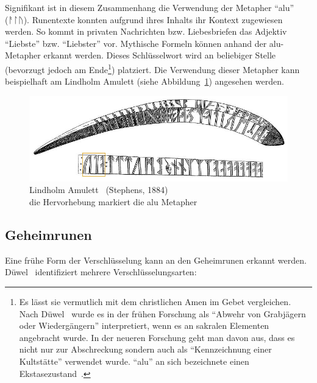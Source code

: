 \documentclass[a4paper]{scrartcl}
\begin{document}
Signifikant ist in diesem Zusammenhang die Verwendung der Metapher \enquote{alu} ({\runicfont ᚨᛚᚢ}). Runentexte konnten aufgrund ihres Inhalts ihr Kontext zugewiesen werden. So kommt in privaten Nachrichten bzw. Liebesbriefen das Adjektiv \enquote{Liebste} bzw. \enquote{Liebster} vor. Mythische Formeln können anhand der alu-Metapher erkannt werden. Dieses Schlüsselwort wird an beliebiger Stelle (bevorzugt jedoch am Ende\footnote{Es lässt sie vermutlich mit dem christlichen Amen im Gebet vergleichen. Nach Düwel~\cite[S. 36]{düwel} wurde es in der frühen Forschung als \enquote{Abwehr von Grabjägern oder Wiedergängern} interpretiert, wenn es an sakralen Elementen angebracht wurde. In der neueren Forschung geht man davon aus, dass es nicht nur zur Abschreckung sondern auch als \enquote{Kennzeichnung einer Kultstätte} verwendet wurde. \enquote{alu} an sich bezeichnete einen Ekstasezustand~\cite[S. 36]{düwel}.}) platziert. Die Verwendung dieser Metapher kann beispielhaft am Lindholm Amulett (siehe Abbildung~\ref{fig:lindholm}) angesehen werden.
%
\begin{figure}[p]
  \begin{center}
    \includegraphics[width=\textwidth]{images/lindholm_amulet.jpg}
    \caption{Lindholm Amulett~\cite{lindholm} (Stephens, 1884) \\ die Hervorhebung markiert die {\glqq alu\grqq} Metapher}
    \label{fig:lindholm}
  \end{center}
\end{figure}

\subsection{Geheimrunen}
%
Eine frühe Form der Verschlüsselung kann an den Geheimrunen erkannt werden. Düwel~\cite[S. 182]{düwel} identifiziert mehrere Verschlüsselungsarten:
\end{document}
